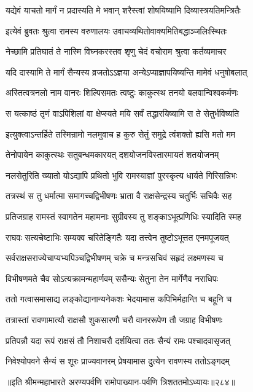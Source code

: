 \twolineshloka
{यद्येवं याचतो मार्गं न प्रदास्यति मे भवान्}
{शरैस्त्वां शोषयिष्यामि दिव्यास्त्रयतिमन्त्रितैः}


\twolineshloka
{इत्येवं ब्रुवतः श्रुत्वा रामस्य वरुणालयः}
{उवाचव्यथितोवाक्यमितिबद्धाञ्जलिःस्थितः}


\twolineshloka
{नेच्छामि प्रतिघातं ते नास्मि विघ्नकरस्तव}
{शृणु चेदं वचोराम श्रुत्वा कर्तव्यमाचर}


\twolineshloka
{यदि दास्यामि ते मार्गं सैन्यस्य व्रजतोऽऽज्ञया}
{अन्येऽप्याज्ञापयिष्यन्ति मामेवं धनुषोबलात्}


\twolineshloka
{अस्तित्वत्रनलो नाम वानरः शिल्पिसमतः}
{त्वष्टुः काकुत्स्थ तनयो बलवान्विश्वकर्मणः}


\twolineshloka
{स यत्काष्ठं तृणं वाऽपिशिलां वा क्षेप्स्यते मयि}
{सर्वं तद्धारयिष्यामि स ते सेतुर्भविष्यति}


\twolineshloka
{इत्युक्त्वाऽन्तर्हिते तस्मिन्रामो नलमुवाच ह}
{कुरु सेतुं समुद्रे त्वंशक्तो ह्यसि मतो मम}


\twolineshloka
{तेनोपायेन काकुत्स्थः सतुबन्धमकारयत्}
{दशयोजनविस्तारमायतं शतयोजनम्}


\twolineshloka
{नलसेतुरिति ख्यातो योऽद्यापि प्रथितो भुवि}
{रामस्याज्ञां पुरस्कृत्य धार्यते गिरिसन्निभः}


\twolineshloka
{तत्रस्थं स तु धर्मात्मा समागच्चद्विभीषणः}
{भ्राता वै राक्षसेन्द्रस्य चतुर्भिः सचिवैः सह}


\twolineshloka
{प्रतिजग्राह रामस्तं स्वागतेन महामनाः}
{सुग्रीवस्य तु शङ्काऽभूत्प्रणिधिः स्यादिति स्मह}


\twolineshloka
{राघवः सत्यचेष्टाभिः सम्यक्व चरितेङ्गितैः}
{यदा तत्त्वेन तुष्टोऽभूत्तत एनमपूजयत्}


\twolineshloka
{सर्वराक्षसराज्येचाप्यभ्यपिञ्चद्विभीषणम्}
{चक्रे च मन्त्रसचिवं सहृदं लक्ष्मणस्य च}


\twolineshloka
{विभीषणमते चैव सोऽत्यक्रामन्महार्णवम्}
{ससैन्यः सेतुना तेन मार्गेणैव नराधिपः}


\twolineshloka
{ततो गत्वासमासाद्य लङ्कोद्यानान्यनेकशः}
{भेदयामास कपिभिर्महान्ति च बहूनि च}


\twolineshloka
{तत्रास्तां रावणामात्यौ राक्षसौ शुकसारणौ}
{चरौ वानररूपेण तौ जग्राह विभीषणः}


\twolineshloka
{प्रतिपन्नौ यदा रूपं राक्षसं तौ निशाचरौ}
{दर्शयित्वा ततः सैन्यं रामः पश्चादवासृजत्}


\twolineshloka
{निवेश्योपवने सैन्यं स शूरः प्राज्यवानरम्}
{प्रेषयामास दुत्येन रावणस्य ततोऽङ्गदम्}


॥इति श्रीमन्महाभारते अरण्यपर्वणि रामोपाख्यान-पर्वणि त्रिशततमोऽध्यायः॥२८४॥

